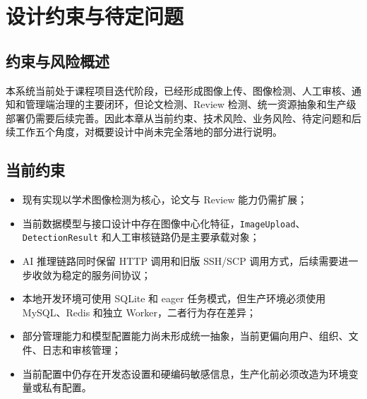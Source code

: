 \section{设计约束与待定问题}

\subsection{约束与风险概述}
本系统当前处于课程项目迭代阶段，已经形成图像上传、图像检测、人工审核、通知和管理端治理的主要闭环，但论文检测、Review 检测、统一资源抽象和生产级部署仍需要后续完善。因此本章从当前约束、技术风险、业务风险、待定问题和后续工作五个角度，对概要设计中尚未完全落地的部分进行说明。

\subsection{当前约束}
\begin{itemize}[leftmargin=2em]
    \item 现有实现以学术图像检测为核心，论文与 Review 能力仍需扩展；
    \item 当前数据模型与接口设计中存在图像中心化特征，\texttt{ImageUpload}、\texttt{DetectionResult} 和人工审核链路仍是主要承载对象；
    \item AI 推理链路同时保留 HTTP 调用和旧版 SSH/SCP 调用方式，后续需要进一步收敛为稳定的服务间协议；
    \item 本地开发环境可使用 SQLite 和 eager 任务模式，但生产环境必须使用 MySQL、Redis 和独立 Worker，二者行为存在差异；
    \item 部分管理能力和模型配置能力尚未形成统一抽象，当前更偏向用户、组织、文件、日志和审核管理；
    \item 当前配置中仍存在开发态设置和硬编码敏感信息，生产化前必须改造为环境变量或私有配置。
\end{itemize}

